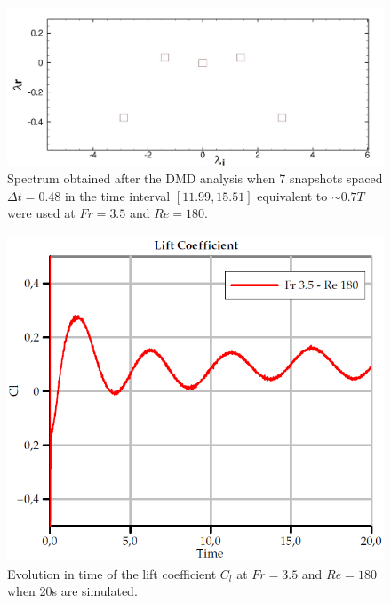 \begin{figure}[ht]
  \centering
  \includegraphics[width=0.95\columnwidth]{images_10thspheric/modos2.jpeg}
  \caption{Spectrum obtained after the DMD analysis when 7 snapshots spaced $\Delta t=0.48$ in the time interval $[11.99,15.51]$ equivalent to $\sim0.7T$ were used at $Fr=3.5$ and $Re=180$.}
  \label{fg:DMD_spectrum}
\end{figure}

\begin{figure}[ht]
  \centering
  \includegraphics[width=0.95\columnwidth]{images_10thspheric/ClvstimeFr035.png}
  \caption{Evolution in time of the lift coefficient $C_l$ at $Fr=3.5$ and $Re=180$ when 20s are simulated.}
  \label{fg:Liftversustime}
\end{figure}

